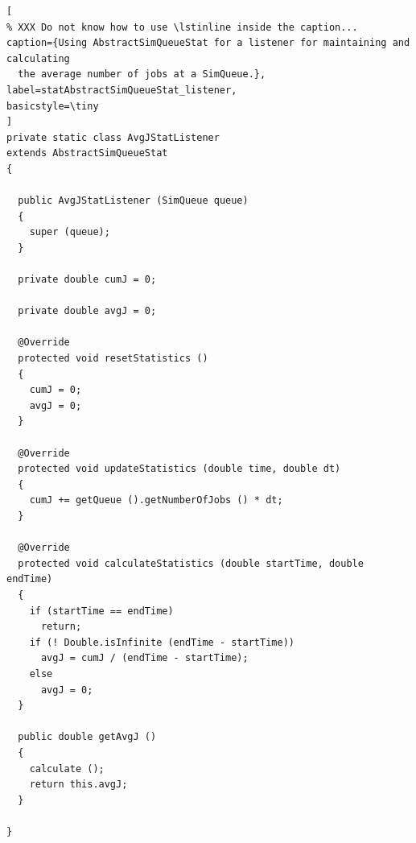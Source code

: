 \documentclass[12pt]{book}
\begin{document}
\begin{lstlisting}[
% XXX Do not know how to use \lstinline inside the caption...
caption={Using AbstractSimQueueStat for a listener for maintaining and calculating
  the average number of jobs at a SimQueue.},
label=statAbstractSimQueueStat_listener,
basicstyle=\tiny
]
private static class AvgJStatListener
extends AbstractSimQueueStat
{

  public AvgJStatListener (SimQueue queue)
  {
    super (queue);
  }
    
  private double cumJ = 0;
    
  private double avgJ = 0;
    
  @Override
  protected void resetStatistics ()
  {
    cumJ = 0;
    avgJ = 0;
  }

  @Override
  protected void updateStatistics (double time, double dt)
  {
    cumJ += getQueue ().getNumberOfJobs () * dt;
  }

  @Override
  protected void calculateStatistics (double startTime, double endTime)
  {
    if (startTime == endTime)
      return;
    if (! Double.isInfinite (endTime - startTime))
      avgJ = cumJ / (endTime - startTime);
    else
      avgJ = 0;
  }
    
  public double getAvgJ ()
  {
    calculate ();
    return this.avgJ;
  }
    
}
\end{lstlisting}
\end{document}
